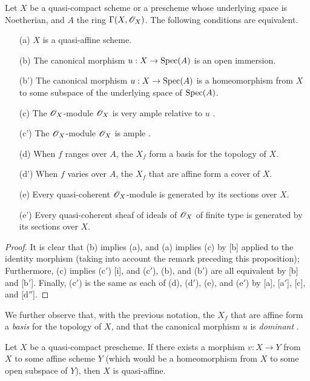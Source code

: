\begin{proposition}[5.1.2]
\label{II.5.1.2}
Let $X$ be a quasi-compact scheme or a prescheme whose underlying space is Noetherian, and $A$ the ring $\Gamma(X,\mathscr{O}_X)$.
The following conditions are equivalent.
\begin{enumerate}
  \item[{\rm(a)}] $X$ is a quasi-affine scheme.
  \item[{\rm(b)}] The canonical morphism $u:X\to\Spec(A)$ is an open immersion.
  \item[{\rm(b')}] The canonical morphism $u:X\to\Spec(A)$ is a homeomorphism from $X$ to some subspace of the underlying space of $\operatorname{Spec}(A)$.
  \item[{\rm(c)}] The $\mathscr{O}_X$-module $\mathscr{O}_X$ is very ample relative to $u$ .
  \item[{\rm(c')}] The $\mathscr{O}_X$-module $\mathscr{O}_X$ is ample .
  \item[{\rm(d)}] When $f$ ranges over $A$, the $X_f$ form a basis for the topology of $X$.
  \item[{\rm(d')}] When $f$ varies over $A$, the $X_f$ that are affine form a cover of $X$.
  \item[{\rm(e)}] Every quasi-coherent $\mathscr{O}_X$-module is generated by its sections over $X$.
  \item[{\rm(e')}] Every quasi-coherent sheaf of ideals of $\mathscr{O}_X$ of finite type is generated by its sections over $X$.
\end{enumerate}
\end{proposition}

\begin{proof}
It is clear that (b) implies (a), and (a) implies (c) by [b] applied to the identity morphism (taking into account the remark preceding this proposition);
Furthermore, (c) implies (c$'$) [i], and (c$'$), (b), and (b$'$) are all equivalent by [b] and [b$'$].
Finally, (c$'$) is the same as each of (d), (d$'$), (e), and (e$'$) by [a], [a$'$], [c], and [d$''$].
\end{proof}

We further observe that, with the previous notation, the $X_f$ that are affine form a \emph{basis} for the topology of $X$, and that the canonical morphism $u$ is \emph{dominant} .

\begin{corollary}[5.1.3]
\label{1.5.1.3}
Let $X$ be a quasi-compact prescheme.
If there exists a morphism $v:X\to Y$ from $X$ to some affine scheme $Y$ (which would be a homeomorphism from $X$ to some open subspace of $Y$), then $X$ is quasi-affine.
\end{corollary}

